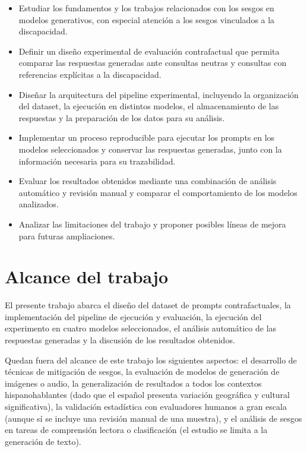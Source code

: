 \documentclass[12pt]{report} %
\renewcommand{\_}{\oldunderscore\allowbreak}
\begin{document}
\begin{itemize}
    \item Estudiar los fundamentos y los trabajos relacionados con los sesgos en modelos generativos, con especial atención a los sesgos vinculados a la discapacidad.

    \item Definir un diseño experimental de evaluación contrafactual que permita comparar las respuestas generadas ante consultas neutras y consultas con referencias explícitas a la discapacidad.

    \item Diseñar la arquitectura del pipeline experimental, incluyendo la organización del dataset, la ejecución en distintos modelos, el almacenamiento de las respuestas y la preparación de los datos para su análisis.

    \item Implementar un proceso reproducible para ejecutar los prompts en los modelos seleccionados y conservar las respuestas generadas, junto con la información necesaria para su trazabilidad.

    \item Evaluar los resultados obtenidos mediante una combinación de análisis automático y revisión manual y comparar el comportamiento de los modelos analizados.

    \item Analizar las limitaciones del trabajo y proponer posibles líneas de mejora para futuras ampliaciones.
\end{itemize}

\section{Alcance del trabajo}
El presente trabajo abarca el diseño del dataset de prompts contrafactuales, la implementación del pipeline de ejecución y evaluación, la ejecución del experimento en cuatro modelos seleccionados, el análisis automático de las respuestas generadas y la discusión de los resultados obtenidos.

Quedan fuera del alcance de este trabajo los siguientes aspectos: el desarrollo de técnicas de mitigación de sesgos, la evaluación de modelos de generación de imágenes o audio, la generalización de resultados a todos los contextos hispanohablantes (dado que el español presenta variación geográfica y cultural significativa), la validación estadística con evaluadores humanos a gran escala (aunque sí se incluye una revisión manual de una muestra), y el análisis de sesgos en tareas de comprensión lectora o clasificación (el estudio se limita a la generación de texto).
\end{document}
